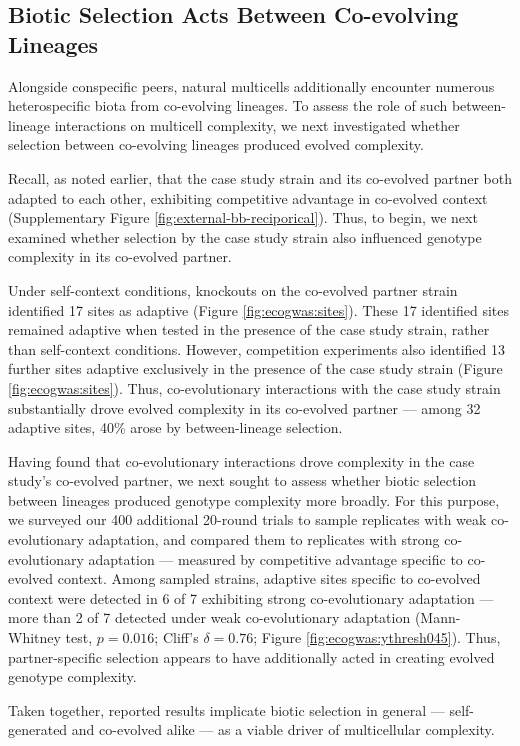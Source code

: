 \subsection{Biotic Selection Acts Between Co-evolving Lineages}
\label{sec:biotic-selection-acts-between-coevolving-lineages}



Alongside conspecific peers, natural multicells additionally encounter numerous heterospecific biota from co-evolving lineages.
To assess the role of such between-lineage interactions on multicell complexity, we next investigated whether selection between co-evolving lineages produced evolved complexity.

Recall, as noted earlier, that the case study strain and its co-evolved partner both adapted to each other, exhibiting competitive advantage in co-evolved context (Supplementary Figure \ref{fig:external-bb-reciporical}).
Thus, to begin, we next examined whether selection by the case study strain also influenced genotype complexity in its co-evolved partner.

Under self-context conditions, knockouts on the co-evolved partner strain identified 17 sites as adaptive (Figure \ref{fig:ecogwas:sites}).
These 17 identified sites remained adaptive when tested in the presence of the case study strain, rather than self-context conditions.
However, competition experiments also identified 13 further sites adaptive exclusively in the presence of the case study strain (Figure \ref{fig:ecogwas:sites}).
Thus, co-evolutionary interactions with the case study strain substantially drove evolved complexity in its co-evolved partner --- among 32 adaptive sites, 40\% arose by between-lineage selection.

Having found that co-evolutionary interactions drove complexity in the case study's co-evolved partner, we next sought to assess whether biotic selection between lineages produced genotype complexity more broadly.
For this purpose, we surveyed our 400 additional 20-round trials to sample replicates with weak co-evolutionary adaptation, and compared them to replicates with strong co-evolutionary adaptation --- measured by competitive advantage specific to co-evolved context.
Among sampled strains, adaptive sites specific to co-evolved context were detected in 6 of 7 exhibiting strong co-evolutionary adaptation --- more than 2 of 7 detected under weak co-evolutionary adaptation (Mann-Whitney test, $p=0.016$; Cliff's $\delta=0.76$; Figure \ref{fig:ecogwas:ythresh045}).
Thus, partner-specific selection appears to have additionally acted in creating evolved genotype complexity.

Taken together, reported results implicate biotic selection in general --- self-generated and co-evolved alike --- as a viable driver of multicellular complexity.
